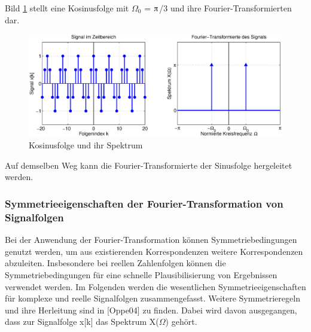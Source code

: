 \noindent Bild \ref{fig:FourierKosinusfolge} stellt eine Kosinusfolge mit $\Omega_{0}$ = $\piup$/3 und ihre Fourier-Transformierten dar.

\begin{figure}[H]
  \centerline{\includegraphics[width=1\textwidth]{Kapitel7/Bilder/image6.eps}}
  \caption{Kosinusfolge und ihr Spektrum}
  \label{fig:FourierKosinusfolge}
\end{figure}

\noindent Auf demselben Weg kann die Fourier-Transformierte der Sinusfolge hergeleitet werden.

\subsubsection{Symmetrieeigenschaften der Fourier-Transformation von Signalfolgen}

\noindent Bei der Anwendung der Fourier-Transformation k\"{o}nnen Symmetriebedingungen genutzt werden, um aus existierenden Korrespondenzen weitere Korrespondenzen abzuleiten. Insbesondere bei reellen Zahlenfolgen k\"{o}nnen die Symmetriebedingungen f\"{u}r eine schnelle Plausibilisierung von Ergebnissen verwendet werden. \newline
\noindent Im Folgenden werden die wesentlichen Symmetrieeigenschaften f\"{u}r komplexe und reelle Signalfolgen zusammengefasst. Weitere Symmetrieregeln und ihre Herleitung sind in [Oppe04] zu finden. Dabei wird davon ausgegangen, dass zur Signalfolge x[k] das Spektrum X($\Omega$) geh\"{o}rt.

